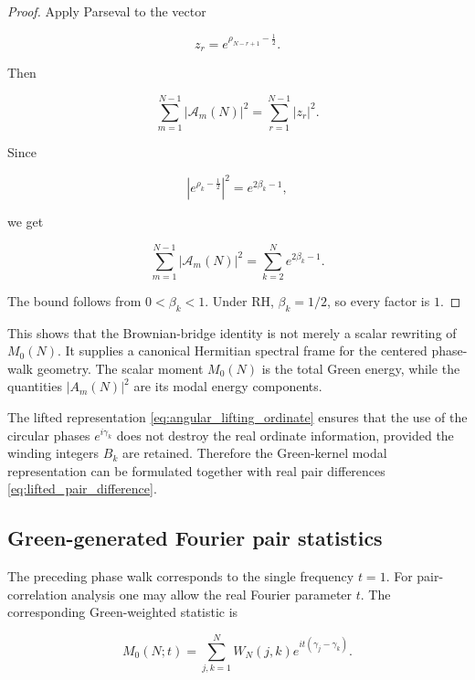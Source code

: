 \documentclass[11pt]{amsart}
\numberwithin{equation}{section}
\theoremstyle{plain}
\theoremstyle{definition}
\theoremstyle{remark}
\begin{document}
\begin{proof}
Apply Parseval to the vector

\begin{equation}
z_r=e^{\rho_{N-r+1}-\frac12}.
\end{equation}

Then

\begin{equation}
\sum_{m=1}^{N-1}|\mathcal A_m(N)|^2
=
\sum_{r=1}^{N-1}
|z_r|^2.
\end{equation}

Since

\begin{equation}
\left|e^{\rho_k-\frac12}\right|^2
=
e^{2\beta_k-1},
\end{equation}

we get

\begin{equation}
\sum_{m=1}^{N-1}|\mathcal A_m(N)|^2
=
\sum_{k=2}^{N}e^{2\beta_k-1}.
\end{equation}

The bound follows from \(0<\beta_k<1\). Under RH, \(\beta_k=1/2\), so
every factor is \(1\).
\end{proof}

This shows that the Brownian-bridge identity is not merely a scalar
rewriting of \(M_0(N)\). It supplies a canonical Hermitian spectral frame
for the centered phase-walk geometry. The scalar moment \(M_0(N)\) is
the total Green energy, while the quantities \(|A_m(N)|^2\) are its
modal energy components.

The lifted representation \eqref{eq:angular_lifting_ordinate} ensures
that the use of the circular phases \(e^{i\gamma_k}\) does not destroy
the real ordinate information, provided the winding integers \(B_k\) are
retained. Therefore the Green-kernel modal representation can be
formulated together with real pair differences
\eqref{eq:lifted_pair_difference}.

\subsection{Green-generated Fourier pair statistics}
\label{subsec:green_generated_fourier_pair_statistics}

The preceding phase walk corresponds to the single frequency \(t=1\).
For pair-correlation analysis one may allow the real Fourier parameter
\(t\). The corresponding Green-weighted statistic is

\begin{equation}
M_0(N;t)
=
\sum_{j,k=1}^{N}
W_N(j,k)e^{it(\gamma_j-\gamma_k)}.
\label{eq:t_deformed_green_statistic}
\end{equation}
\end{document}
